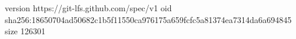 version https://git-lfs.github.com/spec/v1
oid sha256:18650704ad50682c1b5f11550ca976175a659fcfc5a81374ea7314da6a694845
size 126301
